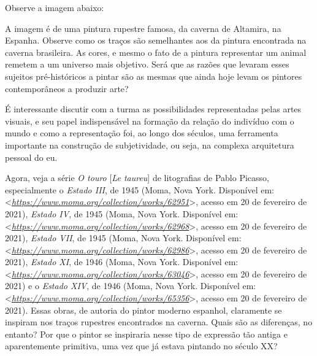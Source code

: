 \documentclass{extrarticle}
\begin{document}
Observe a imagem abaixo:


  A imagem é de uma pintura rupestre famosa, da caverna de Altamira, na
  Espanha. Observe como os traços são semelhantes aos da pintura
  encontrada na caverna brasileira. As cores, e mesmo o fato de a
  pintura representar um animal remetem a um universo mais objetivo.
  Será que as razões que levaram esses sujeitos pré-históricos a pintar
  são as mesmas que ainda hoje levam os pintores contemporâneos a
  produzir arte?

  É interessante discutir com a turma as possibilidades representadas
  pelas artes visuais, e seu papel indispensável na formação da relação
  do indivíduo com o mundo e como a representação foi, ao longo dos
  séculos, uma ferramenta importante na construção de subjetividade, ou
  seja, na complexa arquitetura pessoal do eu.

Agora, veja a série \emph{O touro} {[}\emph{Le taureu}{]} de
  litografias de Pablo Picasso, especialmente o \emph{Estado III}, de
  1945 (Moma, Nova York. Disponível em:
  \textless{}\href{https://www.moma.org/collection/works/62951}{\emph{https://www.moma.org/collection/works/62951}}\textgreater{},
  acesso em 20 de fevereiro de 2021), \emph{Estado IV}, de 1945 (Moma,
  Nova York. Disponível em:
  \textless{}\href{https://www.moma.org/collection/works/62968}{\emph{https://www.moma.org/collection/works/62968}}\textgreater{},
  acesso em 20 de fevereiro de 2021), \emph{Estado VII}, de 1945 (Moma,
  Nova York. Disponível em:
  \textless{}\href{https://www.moma.org/collection/works/62986}{\emph{https://www.moma.org/collection/works/62986}}\textgreater{},
  acesso em 20 de fevereiro de 2021), \emph{Estado XI}, de 1946 (Moma,
  Nova York. Disponível em:
  \textless{}\href{https://www.moma.org/collection/works/63046}{\emph{https://www.moma.org/collection/works/63046}}\textgreater{},
  acesso em 20 de fevereiro de 2021) e o \emph{Estado XIV}, de 1946
  (Moma, Nova York. Disponível em:
  \textless{}\href{https://www.moma.org/collection/works/65356}{\emph{https://www.moma.org/collection/works/65356}}\textgreater{},
  acesso em 20 de fevereiro de 2021). Essas obras, de autoria do pintor
  moderno espanhol, claramente se inspiram nos traços rupestres
  encontrados na caverna. Quais são as diferenças, no entanto? Por que o
  pintor se inspiraria nesse tipo de expressão tão antiga e
  aparentemente primitiva, uma vez que já estava pintando no século XX?
\end{document}
